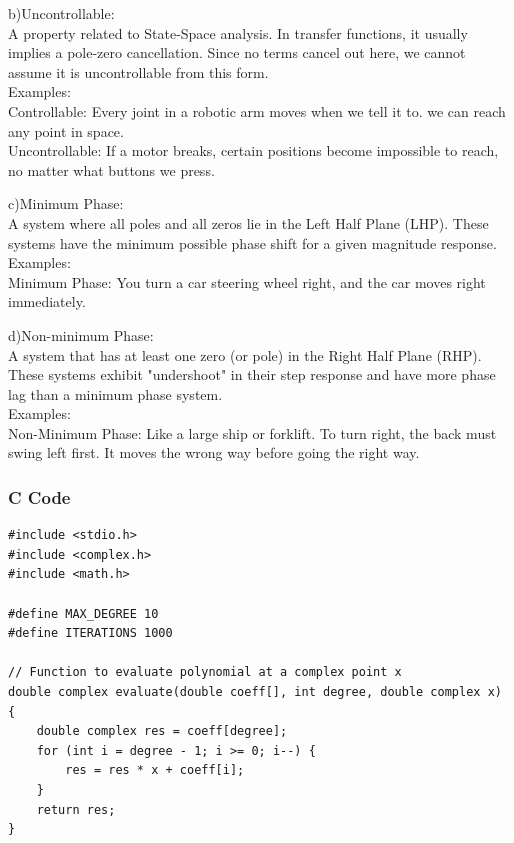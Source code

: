 \documentclass{beamer}
\begin{document}
\begin{frame}{}
b)Uncontrollable:\\
A property related to State-Space analysis. In transfer functions, it usually implies a pole-zero cancellation. Since no terms cancel out here, we cannot assume it is uncontrollable from this form.\\

Examples:\\
Controllable: Every joint in a robotic arm moves when we tell it to. we can reach any point in space.\\

Uncontrollable: If a motor breaks, certain positions become impossible to reach, no matter what buttons we press.\\
\end{frame}

\begin{frame}
c)Minimum Phase:\\
A system where all poles and all zeros lie in the Left Half Plane (LHP). These systems have the minimum possible phase shift for a given magnitude response.\\

Examples:\\
Minimum Phase: You turn a car steering wheel right, and the car moves right immediately.\\
\end{frame}
\begin{frame}
d)Non-minimum Phase:\\
A system that has at least one zero (or pole) in the Right Half Plane (RHP). These systems exhibit "undershoot" in their step response and have more phase lag than a minimum phase system.\\

Examples:\\
Non-Minimum Phase: Like a large ship or forklift. To turn right, the back must swing left first. It moves the wrong way before going the right way.
\end{frame}

\begin{frame}[fragile]
\frametitle{C Code}
\begin{lstlisting}
#include <stdio.h>
#include <complex.h>
#include <math.h>

#define MAX_DEGREE 10
#define ITERATIONS 1000

// Function to evaluate polynomial at a complex point x
double complex evaluate(double coeff[], int degree, double complex x) {
    double complex res = coeff[degree];
    for (int i = degree - 1; i >= 0; i--) {
        res = res * x + coeff[i];
    }
    return res;
}
\end{lstlisting}
\end{frame}
\end{document}

